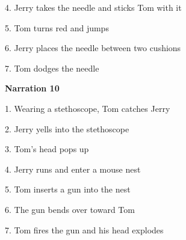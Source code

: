 \begin{appendix}
4. Jerry takes the needle and sticks Tom with it \vspace{-0.3cm}

5. Tom turns red and jumps \vspace{-0.3cm}

6. Jerry places the needle between two cushions \vspace{-0.3cm}

7. Tom dodges the needle

\textbf{Narration 10} \vspace{-0.3cm}

1. Wearing a stethoscope, Tom catches Jerry \vspace{-0.3cm}

2. Jerry yells into the stethoscope \vspace{-0.3cm}

3. Tom's head pops up \vspace{-0.3cm}

4. Jerry runs and enter a mouse nest \vspace{-0.3cm}

5. Tom inserts a gun into the nest \vspace{-0.3cm}

6. The gun bends over toward Tom \vspace{-0.3cm}

7. Tom fires the gun and his head explodes

\hspace{0.5cm}
\end{appendix}
